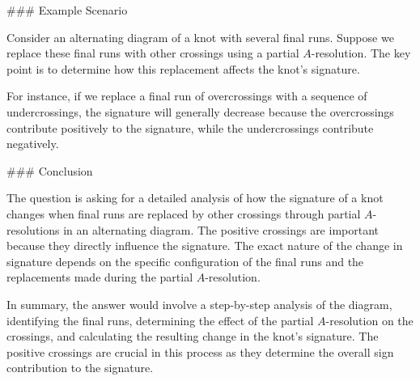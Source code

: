 ### Example Scenario

Consider an alternating diagram of a knot with several final runs. Suppose we replace these final runs with other crossings using a partial \(A\)-resolution. The key point is to determine how this replacement affects the knot's signature.

For instance, if we replace a final run of overcrossings with a sequence of undercrossings, the signature will generally decrease because the overcrossings contribute positively to the signature, while the undercrossings contribute negatively.

### Conclusion

The question is asking for a detailed analysis of how the signature of a knot changes when final runs are replaced by other crossings through partial \(A\)-resolutions in an alternating diagram. The positive crossings are important because they directly influence the signature. The exact nature of the change in signature depends on the specific configuration of the final runs and the replacements made during the partial \(A\)-resolution.

In summary, the answer would involve a step-by-step analysis of the diagram, identifying the final runs, determining the effect of the partial \(A\)-resolution on the crossings, and calculating the resulting change in the knot's signature. The positive crossings are crucial in this process as they determine the overall sign contribution to the signature.